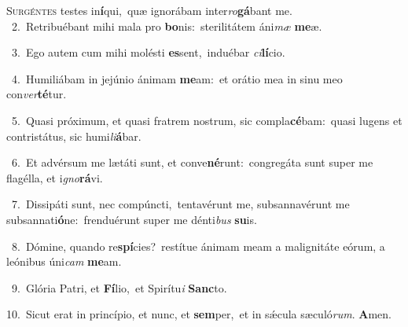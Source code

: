 \lettrine{\initial\textcolor{\initialcolor}{S}}{urgéntes} testes in\-\textbf{í}\-qui,~\star quæ ignorábam inter\-\textit{ro}\-\textbf{gá}bant me.\\
{\numbfont\textcolor{\numbcolor}{~2.}}~Retribuébant mihi mala pro \textbf{bo}\-nis:~\star sterilitátem áni\textit{mæ} \textbf{me}\-æ.\par
{\numbfont\textcolor{\numbcolor}{~3.}}~Ego autem cum mihi molésti \textbf{es}\-sent,~\star induébar \textit{ci}\-\textbf{lí}cio.\par
{\numbfont\textcolor{\numbcolor}{~4.}}~Humiliábam in jejúnio ánimam \textbf{me}\-am:~\star et orátio mea in sinu meo con\-\textit{ver}\-\textbf{té}tur.\par
{\numbfont\textcolor{\numbcolor}{~5.}}~Quasi próximum, et quasi fratrem nostrum, sic compla\-\textbf{cé}\-bam:~\star quasi lugens et contristátus, sic humi\-\textit{li}\-\textbf{á}bar.\par
{\numbfont\textcolor{\numbcolor}{~6.}}~Et advérsum me lætáti sunt, et conve\-\textbf{né}\-runt:~\star congregáta sunt super me flagélla, et i\-\textit{gno}\-\textbf{rá}vi.\par
{\numbfont\textcolor{\numbcolor}{~7.}}~Dissipáti sunt, nec compúncti,~\dagger tentavérunt me, subsannavérunt me subsannati\-\textbf{ó}\-ne:~\star frenduérunt super me dénti\textit{bus} \textbf{su}\-is.\par
{\numbfont\textcolor{\numbcolor}{~8.}}~Dómine, quando re\-\textbf{spí}\-cies?~\star restítue ánimam meam a malignitáte eórum, a leónibus úni\textit{cam} \textbf{me}\-am.\par
{\numbfont\textcolor{\numbcolor}{~9.}}~Glória Patri, et \textbf{Fí}\-lio,~\star et Spirítu\textit{i} \textbf{Sanc}\-to.\par
{\numbfont\textcolor{\numbcolor}{10.}}~Sicut erat in princípio, et nunc, et \textbf{sem}\-per,~\star et in sǽcula sæculó\-\textit{rum}\-. \textbf{A}\-men.\par
